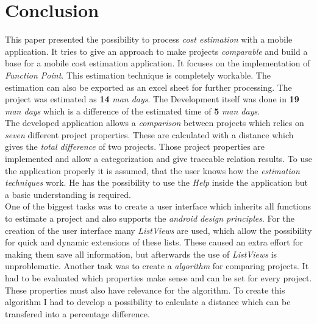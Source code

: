 \chapter{Conclusion}\label{conclusion}

This paper presented the possibility to process \textit{cost estimation} with a mobile application. It tries to give an approach to make projects \textit{comparable} and build a base for a mobile cost estimation application. It focuses on the implementation of \textit{Function Point}. This estimation technique is completely workable. The estimation can also be exported as an excel sheet for further processing. The project was estimated as \textbf{14} \textit{man days}. The Development itself was done in \textbf{19} \textit{man days} which is a difference of the estimated time of \textbf{5} \textit{man days}.\\
The developed application allows a \textit{comparison} between projects which relies on \textit{seven} different project properties. These are calculated with a distance which gives the \textit{total difference} of two projects. Those project properties are implemented and allow a categorization and give traceable relation results. To use the application properly it is assumed, that the user knows how the \textit{estimation techniques} work. He has the possibility to use the \textit{Help} inside the application but a basic understanding is required.\\
One of the biggest tasks was to create a user interface which inherits all functions to estimate a project and also supports the \textit{android design principles}. For the creation of the user interface many \textit{ListViews} are used, which allow the possibility for quick and dynamic extensions of these lists. These caused an extra effort for making them save all information, but afterwards the use of \textit{ListViews} is unproblematic. Another task was to create a \textit{algorithm} for comparing projects. It had to be evaluated which properties make sense and can be set for every project. These properties must also have relevance for the algorithm. To create this algorithm I had to develop a possibility to calculate a distance which can be transfered into a percentage difference. \\
